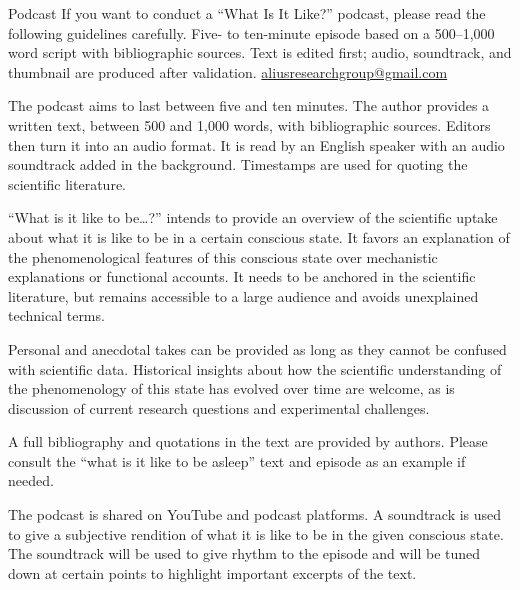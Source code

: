 \documentclass[11pt]{article}
\begin{document}
\guideHeader
  {Podcast}
  {If you want to conduct a ``What Is It Like?'' podcast, please read the following guidelines carefully.}
  {Five- to ten-minute episode based on a 500--1,000 word script with bibliographic sources.}
  {Text is edited first; audio, soundtrack, and thumbnail are produced after validation.}
  {\href{mailto:aliusresearchgroup@gmail.com}{aliusresearchgroup@gmail.com}}


The podcast aims to last between five and ten minutes. The author provides a written text, between 500 and 1,000 words, with bibliographic sources. Editors then turn it into an audio format. It is read by an English speaker with an audio soundtrack added in the background. Timestamps are used for quoting the scientific literature.


``What is it like to be\ldots?'' intends to provide an overview of the scientific uptake about what it is like to be in a certain conscious state. It favors an explanation of the phenomenological features of this conscious state over mechanistic explanations or functional accounts. It needs to be anchored in the scientific literature, but remains accessible to a large audience and avoids unexplained technical terms.

Personal and anecdotal takes can be provided as long as they cannot be confused with scientific data. Historical insights about how the scientific understanding of the phenomenology of this state has evolved over time are welcome, as is discussion of current research questions and experimental challenges.

A full bibliography and quotations in the text are provided by authors. Please consult the ``what is it like to be asleep'' text and episode as an example if needed.

The podcast is shared on YouTube and podcast platforms. A soundtrack is used to give a subjective rendition of what it is like to be in the given conscious state. The soundtrack will be used to give rhythm to the episode and will be tuned down at certain points to highlight important excerpts of the text.

\end{document}
